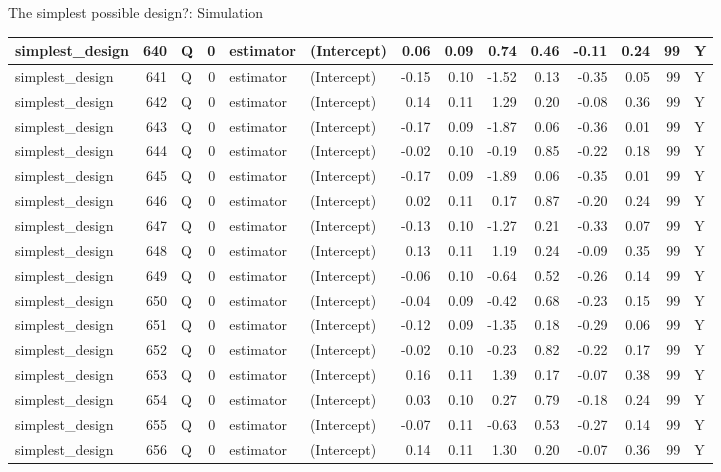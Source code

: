 \documentclass[
  11pt,
  ignorenonframetext,
]{beamer}
\begin{document}
\begin{frame}[fragile]{The simplest possible design?: Simulation}
\begin{tabular}{l|r|l|r|l|l|r|r|r|r|r|r|r|l}
\hline
simplest\_design & 640 & Q & 0 & estimator & (Intercept) & 0.06 & 0.09 & 0.74 & 0.46 & -0.11 & 0.24 & 99 & Y\\
\hline
simplest\_design & 641 & Q & 0 & estimator & (Intercept) & -0.15 & 0.10 & -1.52 & 0.13 & -0.35 & 0.05 & 99 & Y\\
\hline
simplest\_design & 642 & Q & 0 & estimator & (Intercept) & 0.14 & 0.11 & 1.29 & 0.20 & -0.08 & 0.36 & 99 & Y\\
\hline
simplest\_design & 643 & Q & 0 & estimator & (Intercept) & -0.17 & 0.09 & -1.87 & 0.06 & -0.36 & 0.01 & 99 & Y\\
\hline
simplest\_design & 644 & Q & 0 & estimator & (Intercept) & -0.02 & 0.10 & -0.19 & 0.85 & -0.22 & 0.18 & 99 & Y\\
\hline
simplest\_design & 645 & Q & 0 & estimator & (Intercept) & -0.17 & 0.09 & -1.89 & 0.06 & -0.35 & 0.01 & 99 & Y\\
\hline
simplest\_design & 646 & Q & 0 & estimator & (Intercept) & 0.02 & 0.11 & 0.17 & 0.87 & -0.20 & 0.24 & 99 & Y\\
\hline
simplest\_design & 647 & Q & 0 & estimator & (Intercept) & -0.13 & 0.10 & -1.27 & 0.21 & -0.33 & 0.07 & 99 & Y\\
\hline
simplest\_design & 648 & Q & 0 & estimator & (Intercept) & 0.13 & 0.11 & 1.19 & 0.24 & -0.09 & 0.35 & 99 & Y\\
\hline
simplest\_design & 649 & Q & 0 & estimator & (Intercept) & -0.06 & 0.10 & -0.64 & 0.52 & -0.26 & 0.14 & 99 & Y\\
\hline
simplest\_design & 650 & Q & 0 & estimator & (Intercept) & -0.04 & 0.09 & -0.42 & 0.68 & -0.23 & 0.15 & 99 & Y\\
\hline
simplest\_design & 651 & Q & 0 & estimator & (Intercept) & -0.12 & 0.09 & -1.35 & 0.18 & -0.29 & 0.06 & 99 & Y\\
\hline
simplest\_design & 652 & Q & 0 & estimator & (Intercept) & -0.02 & 0.10 & -0.23 & 0.82 & -0.22 & 0.17 & 99 & Y\\
\hline
simplest\_design & 653 & Q & 0 & estimator & (Intercept) & 0.16 & 0.11 & 1.39 & 0.17 & -0.07 & 0.38 & 99 & Y\\
\hline
simplest\_design & 654 & Q & 0 & estimator & (Intercept) & 0.03 & 0.10 & 0.27 & 0.79 & -0.18 & 0.24 & 99 & Y\\
\hline
simplest\_design & 655 & Q & 0 & estimator & (Intercept) & -0.07 & 0.11 & -0.63 & 0.53 & -0.27 & 0.14 & 99 & Y\\
\hline
simplest\_design & 656 & Q & 0 & estimator & (Intercept) & 0.14 & 0.11 & 1.30 & 0.20 & -0.07 & 0.36 & 99 & Y\\

\end{tabular}
\end{frame}
\end{document}
